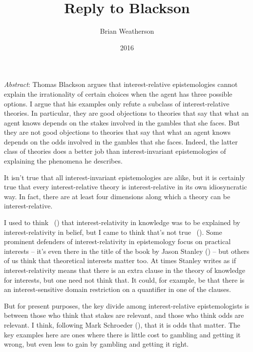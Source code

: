 \documentclass[
  11pt,
  letterpaper,
  DIV=11,
  numbers=noendperiod,
  twoside]{scrartcl}
\title{Reply to Blackson}
\author{Brian Weatherson}
\date{2016}
\renewenvironment{abstract}
 {\vspace{-1.25cm}
 \quotation\small\noindent\emph{Abstract}:}
 {\endquotation}
\begin{document}
\maketitle
\begin{abstract}
Thomas Blackson argues that interest-relative epistemologies cannot
explain the irrationality of certain choices when the agent has three
possible options. I argue that his examples only refute a subclass of
interest-relative theories. In particular, they are good objections to
theories that say that what an agent knows depends on the stakes
involved in the gambles that she faces. But they are not good objections
to theories that say that what an agent knows depends on the odds
involved in the gambles that she faces. Indeed, the latter class of
theories does a better job than interest-invariant epistemologies of
explaining the phenomena he describes.
\end{abstract}


It isn't true that all interest-invariant epistemologies are alike, but
it is certainly true that every interest-relative theory is
interest-relative in its own idiosyncratic way. In fact, there are at
least four dimensions along which a theory can be interest-relative.

I used to think ~()
that interest-relativity in knowledge was to be explained by
interest-relativity in belief, but I came to think that's not true
~(). Some prominent
defenders of interest-relativity in epistemology focus on practical
interests -- it's even there in the title of the book by Jason Stanley
() -- but others of us think that
theoretical interests matter too. At times Stanley writes as if
interest-relativity means that there is an extra clause in the theory of
knowledge for interests, but one need not think that. It could, for
example, be that there is an interest-sensitive domain restriction on a
quantifier in one of the clauses.

But for present purposes, the key divide among interest-relative
epistemologists is between those who think that stakes are relevant, and
those who think odds are relevant. I think, following Mark Schroeder
(), that it is odds that matter. The
key examples here are ones where there is little cost to gambling and
getting it wrong, but even less to gain by gambling and getting it
right.
\end{document}
